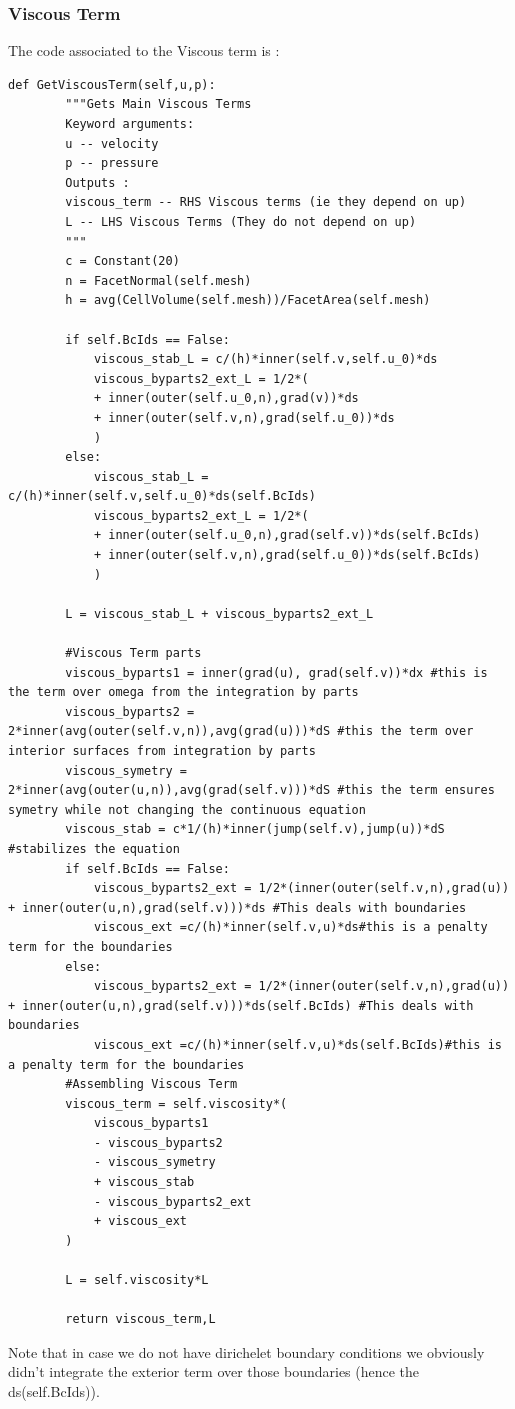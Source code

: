 \documentclass[11pt,twoside,a4paper]{article}
\begin{document}
\subsubsection{Viscous Term}
The code associated to the Viscous term is :
\begin{lstlisting}
def GetViscousTerm(self,u,p):
        """Gets Main Viscous Terms
        Keyword arguments:
        u -- velocity
        p -- pressure
        Outputs :
        viscous_term -- RHS Viscous terms (ie they depend on up)
        L -- LHS Viscous Terms (They do not depend on up)
        """
        c = Constant(20)
        n = FacetNormal(self.mesh)
        h = avg(CellVolume(self.mesh))/FacetArea(self.mesh)

        if self.BcIds == False:
            viscous_stab_L = c/(h)*inner(self.v,self.u_0)*ds
            viscous_byparts2_ext_L = 1/2*(
            + inner(outer(self.u_0,n),grad(v))*ds
            + inner(outer(self.v,n),grad(self.u_0))*ds
            )
        else:
            viscous_stab_L = c/(h)*inner(self.v,self.u_0)*ds(self.BcIds)
            viscous_byparts2_ext_L = 1/2*(
            + inner(outer(self.u_0,n),grad(self.v))*ds(self.BcIds)
            + inner(outer(self.v,n),grad(self.u_0))*ds(self.BcIds)
            )

        L = viscous_stab_L + viscous_byparts2_ext_L

        #Viscous Term parts
        viscous_byparts1 = inner(grad(u), grad(self.v))*dx #this is the term over omega from the integration by parts
        viscous_byparts2 = 2*inner(avg(outer(self.v,n)),avg(grad(u)))*dS #this the term over interior surfaces from integration by parts
        viscous_symetry = 2*inner(avg(outer(u,n)),avg(grad(self.v)))*dS #this the term ensures symetry while not changing the continuous equation
        viscous_stab = c*1/(h)*inner(jump(self.v),jump(u))*dS #stabilizes the equation
        if self.BcIds == False:
            viscous_byparts2_ext = 1/2*(inner(outer(self.v,n),grad(u)) + inner(outer(u,n),grad(self.v)))*ds #This deals with boundaries
            viscous_ext =c/(h)*inner(self.v,u)*ds#this is a penalty term for the boundaries
        else:
            viscous_byparts2_ext = 1/2*(inner(outer(self.v,n),grad(u)) + inner(outer(u,n),grad(self.v)))*ds(self.BcIds) #This deals with boundaries
            viscous_ext =c/(h)*inner(self.v,u)*ds(self.BcIds)#this is a penalty term for the boundaries
        #Assembling Viscous Term
        viscous_term = self.viscosity*(
            viscous_byparts1
            - viscous_byparts2
            - viscous_symetry
            + viscous_stab
            - viscous_byparts2_ext
            + viscous_ext
        )

        L = self.viscosity*L

        return viscous_term,L
\end{lstlisting}
Note that in case we do not have dirichelet boundary conditions we obviously didn't integrate the exterior term over those boundaries (hence the ds(self.BcIds)).
\end{document}
